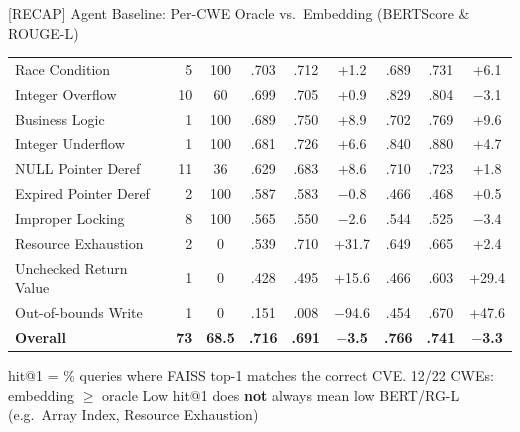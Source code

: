 \documentclass[aspectratio=169,10pt]{beamer}
\newcommand{\chit}[1]{\cellcolor{hit!30} #1}
\newcommand{\cmiss}[1]{\cellcolor{miss!25} #1}
\newcommand{\cwarn}[1]{\cellcolor{warn!30} #1}
\begin{document}
\begin{frame}{[RECAP] Agent Baseline: Per-CWE Oracle vs.\ Embedding (BERTScore \& ROUGE-L)}
{\begin{tabular}{l r c c c c c c c}
    Race Condition                    & 5  & \chit{100}  & .703 & .712 & \chit{+1.2}   & .689 & .731 & \chit{+6.1} \\
    Integer Overflow                  & 10 & \cwarn{60}  & .699 & .705 & \chit{+0.9}   & .829 & .804 & $-$3.1 \\
    Business Logic                    & 1  & \chit{100}  & .689 & .750 & \chit{+8.9}   & .702 & .769 & \chit{+9.6} \\
    Integer Underflow                 & 1  & \chit{100}  & .681 & .726 & \chit{+6.6}   & .840 & .880 & \chit{+4.7} \\
    \midrule
    NULL Pointer Deref                & 11 & \cmiss{36}  & .629 & .683 & \chit{+8.6}   & .710 & .723 & +1.8 \\
    Expired Pointer Deref             & 2  & \chit{100}  & .587 & .583 & $-$0.8         & .466 & .468 & +0.5 \\
    Improper Locking                  & 8  & \chit{100}  & .565 & .550 & $-$2.6         & .544 & .525 & $-$3.4 \\
    Resource Exhaustion               & 2  & \cmiss{0}   & .539 & .710 & \chit{+31.7}  & .649 & .665 & \chit{+2.4} \\
    Unchecked Return Value            & 1  & \cmiss{0}   & .428 & .495 & \chit{+15.6}  & .466 & .603 & \chit{+29.4} \\
    Out-of-bounds Write               & 1  & \cmiss{0}   & .151 & .008 & \cmiss{$-$94.6}& .454 & .670 & \chit{+47.6} \\
    \midrule
    \rowcolor{c1!8}
    \textbf{Overall}                  & \textbf{73} & \textbf{68.5}
                                      & \textbf{.716} & \textbf{.691} & \textbf{$-$3.5}
                                      & \textbf{.766} & \textbf{.741} & \textbf{$-$3.3} \\
    \bottomrule
  \end{tabular}}

  \vspace{0.3em}
  {\scriptsize
  \textcolor{c1}{} hit@1 = \% queries where FAISS top-1 matches the correct CVE.
  \textcolor{hit}{} 12/22 CWEs: embedding $\ge$ oracle \quad
  \textcolor{miss}{} Low hit@1 does \textbf{not} always mean low BERT/RG-L (e.g.\ Array Index, Resource Exhaustion)}

\end{frame}


\end{document}
